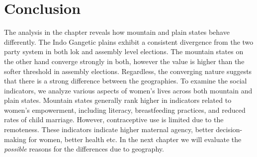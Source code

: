 \section{Conclusion}
The analysis in the chapter reveals how mountain and plain states behave differently. The Indo Gangetic plains exhibit a consistent divergence from the two party system in both lok and assembly level elections. The mountain states on the other hand converge strongly in both, however the value is higher than the softer threshold in assembly elections. Regardless, the converging nature suggests that there is a strong difference between the geographies. To examine the social indicators, we analyze various aspects of women's lives across both mountain and plain states. Mountain states generally rank higher in indicators related to women's empowerment, including literacy, breastfeeding practices, and reduced rates of child marriage. However, contraceptive use is limited due to the remoteness. These indicators indicate higher maternal agency, better decision-making for women, better health etc. In the next chapter we will evaluate the \textit{possible} reasons for the differences due to geography.
